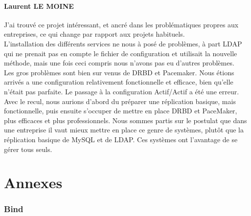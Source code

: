 \documentclass[11pt,a4paper]{report}
\begin{document}
            \subsection{Laurent \textsc{LE MOINE}}
                
                J'ai trouv\'e ce projet int\'eressant, et ancr\'e dans les probl\'ematiques propres aux entreprises, ce qui change par rapport aux projets habituels.\\
                
                L'installation des diff\'erents services ne nous \`a pos\'e de probl\`emes, \`a part LDAP qui ne prenait pas en compte le fichier de configuration et utilisait la nouvelle m\'ethode, mais une fois ceci compris nous n'avons pas eu d'autres probl\`emes.\\
                
                Les gros probl\`emes sont bien sur venus de DRBD et Pacemaker. Nous \'etions arriv\'es a une configuration relativement fonctionnelle et efficace, bien qu'elle n'\'etait pas parfaite. Le passage \`a la configuration Actif/Actif a \'et\'e une erreur.\\
                
                Avec le recul, nous aurions d'abord du pr\'eparer une r\'eplication basique, mais fonctionnelle, puis ensuite s'occuper de mettre en place DRBD et PaceMaker, plus efficaces et plus professionnels. Nous sommes partis sur le postulat que dans une entreprise il vaut mieux mettre en place ce genre de syst\`emes, plut\^ot que la r\'eplication basique de MySQL et de LDAP. Ces syst\`emes ont l'avantage de se g\'erer tous seuls.
                
                \vfill
                \flushleft{}
                
    \appendix
    
    \part{Annexes}
        
        \section{Bind} \label{bind}
            
\end{document}
